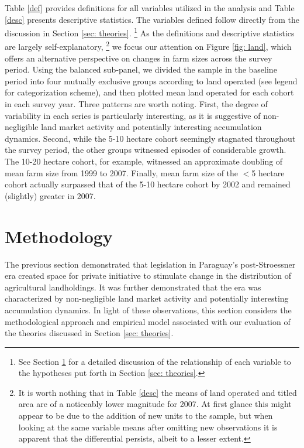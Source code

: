\documentclass[english]{article}
\begin{document}
Table \ref{def} provides definitions for all variables utilized in the analysis 
and Table \ref{desc} presents descriptive statistics. 
The variables defined follow directly from the discussion in Section 
\ref{sec: theories}.%
\footnote{See Section \ref{sec: methodology} for a detailed 
discussion of the relationship of each variable to the hypotheses
put forth in Section \ref{sec: theories}.}
As the definitions and descriptive statistics are largely self-explanatory,%
\footnote{It is worth nothing that in Table \ref{desc} the means of land 
operated and titled area are of a noticeably lower magnitude for 2007. 
At first glance this might appear to be due to the addition of new units to the 
sample, but when looking at the same variable means after omitting new 
observations it is apparent that the differential persists, albeit to a lesser 
extent.}
we focus our attention on Figure \ref{fig: land}, which offers an alternative 
perspective on changes in farm sizes across the survey period.
Using the balanced sub-panel, we divided the sample in the baseline period 
into four mutually exclusive groups according to land operated (see legend for 
categorization scheme), and then plotted mean land operated for each cohort 
in each survey year.
Three patterns are worth noting.
First, the degree of variability in each series is particularly interesting, as it is 
suggestive of non-negligible land market activity and potentially interesting
accumulation dynamics.
Second, while the 5-10 hectare cohort seemingly stagnated throughout the 
survey period, the other groups witnessed episodes of considerable growth.
The 10-20 hectare cohort, for example, witnessed an approximate doubling of 
mean farm size from 1999 to 2007.
Finally, mean farm size of the $<$5 hectare cohort actually surpassed that of the 
5-10 hectare cohort by 2002 and remained (slightly) greater in 2007.


\section{Methodology}
\label{sec: methodology}

The previous section demonstrated that legislation in Paraguay's 
post-Stroessner era created space for private initiative to stimulate change in 
the distribution of agricultural landholdings.
It was further demonstrated that the era was characterized by non-negligible 
land market activity and potentially interesting accumulation dynamics.
In light of these observations, this section considers the methodological 
approach and empirical model associated with our evaluation of the 
theories discussed in Section \ref{sec: theories}.
\end{document}
